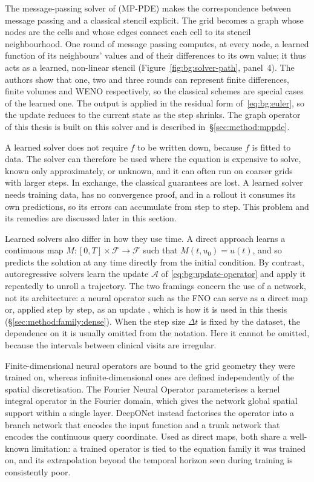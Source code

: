 The message-passing solver of \citet{Brandstetter2022} (MP-PDE) makes
the correspondence between message passing and a classical stencil
explicit. The grid becomes a graph whose nodes are
the cells and whose edges connect each cell to its stencil
neighbourhood. One round of message passing computes, at every node, a
learned function of its neighbours' values and of their differences to
its own value; it thus acts as a learned, non-linear stencil
(Figure~\ref{fig:bg:solver-path}, panel~4). The authors show that one, two and three rounds can
represent finite differences, finite volumes and WENO respectively, so
the classical schemes are special cases of the learned one. The output
is applied in the residual form of~\eqref{eq:bg:euler}, so the update
reduces to the current state as the step shrinks. The graph operator of this thesis is built on this
solver and is described in~\S\ref{sec:method:mppde}.

A learned solver does not require $f$ to be written down, because $f$
is fitted to data. The solver can therefore be used where the equation is
expensive to solve, known only approximately, or unknown, and it can
often run on coarser grids with larger steps. In exchange, the classical
guarantees are lost. A learned solver needs training data, has no
convergence proof, and in a rollout it consumes its own predictions, so
its errors can accumulate from step to step. This problem and its
remedies are discussed later in this section.

Learned solvers also differ in how they use time. A direct approach
learns a continuous map
$M: [0, T] \times \mathcal{F} \to \mathcal{F}$ such that
$M(t, u_0) = u(t)$, and so predicts the solution at any time directly
from the initial condition. By contrast, autoregressive
solvers learn the update $\mathcal{A}$ of
\eqref{eq:bg:update-operator} and apply it repeatedly to unroll a
trajectory. The two framings concern the use of a network, not its
architecture: a neural operator such as the FNO can serve as a direct map
or, applied step by step, as an update \citep{Li2021}, which is how it is
used in this thesis (\S\ref{sec:method:family:dense}). When the step size $\Delta t$ is fixed by the dataset, the
dependence on it is usually omitted from the notation. Here it cannot be
omitted, because the intervals between clinical visits are irregular.

Finite-dimensional neural operators are bound to the grid geometry they
were trained on, whereas infinite-dimensional ones are defined
independently of the spatial discretisation. The Fourier Neural Operator
\citep{Li2021} parameterises a kernel integral operator in the Fourier
domain, which gives the network global spatial support within a single
layer. DeepONet \citep{Lu2021} instead factorises the operator into a
branch network that encodes the input function and a trunk network that
encodes the continuous query coordinate. Used as direct maps, both share
a well-known limitation: a trained operator is tied to the equation family it was
trained on, and its extrapolation beyond the temporal horizon seen during
training is consistently poor.

